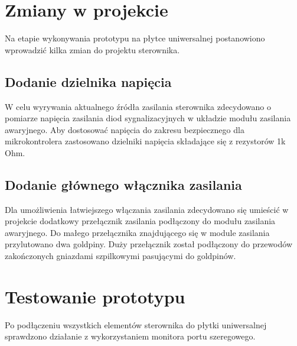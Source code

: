 \documentclass[11pt]{report}
\begin{document}
 \section{Zmiany w projekcie}
 Na etapie wykonywania prototypu na płytce uniwersalnej postanowiono wprowadzić kilka zmian do projektu sterownika.
 \subsection{Dodanie dzielnika napięcia}
 W celu wyrywania aktualnego źródła zasilania sterownika zdecydowano o pomiarze napięcia zasilania diod sygnalizacyjnych w układzie modułu zasilania awaryjnego. Aby dostosować napięcia do zakresu bezpiecznego dla mikrokontrolera zastosowano dzielniki napięcia składające się z rezystorów 1k Ohm.
 \subsection{Dodanie głównego włącznika zasilania}
 Dla umożliwienia łatwiejszego włączania zasilania zdecydowano się umieścić w projekcie dodatkowy przełącznik zasilania podłączony do modułu zasilania awaryjnego. Do małego przełącznika znajdującego się w module zasilania przylutowano dwa goldpiny. Duży przełącznik został podłączony do przewodów zakończonych gniazdami szpilkowymi pasującymi do goldpinów.

 \section{Testowanie prototypu}
 Po podłączeniu wszystkich elementów sterownika do płytki uniwersalnej sprawdzono działanie z wykorzystaniem monitora portu szeregowego.
 
\end{document}
